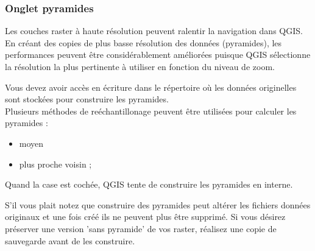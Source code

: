 \subsubsection{Onglet pyramides}\label{raster_pyramids}

Les couches raster \`a haute r\'esolution peuvent ralentir la navigation dans QGIS.
En cr\'eant des copies de plus basse r\'esolution des donn\'ees (pyramides), les
performances peuvent \^etre consid\'erablement am\'elior\'ees puisque QGIS s\'electionne
la r\'esolution la plus pertinente \`a utiliser en fonction du niveau de zoom.


Vous devez avoir acc\`es en \'ecriture dans le r\'epertoire o\`u les donn\'ees
originelles sont stock\'ees pour construire les pyramides. \\
Plusieurs m\'ethodes de re\'echantillonage peuvent \^etre utilis\'ees pour calculer les
pyramides :
\begin{itemize}
\item moyen
\item plus proche voisin ;
\end{itemize}

Quand la case  est
coch\'ee, QGIS tente de construire les pyramides en interne.

S'il vous plait notez que construire des pyramides peut alt\'erer les fichiers
donn\'ees originaux et une fois cr\'e\'e ils ne peuvent plus \^etre supprim\'e. Si vous
d\'esirez pr\'eserver une version 'sans pyramide' de vos raster, r\'ealisez une copie
de sauvegarde avant de les construire.

